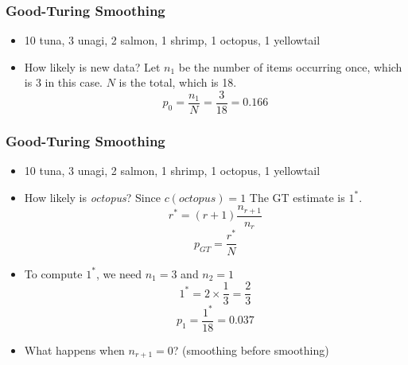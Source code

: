 \documentclass{beamer}
\begin{document}
\begin{frame}
\frametitle{Good-Turing Smoothing}
\begin{itemize}[<+->]
\item { \color{blue} 10} tuna,  { \color{blue} 3} unagi,  { \color{blue} 2} salmon,  { \color{blue} 1} shrimp,  { \color{blue} 1} octopus,  { \color{blue} 1} yellowtail
\item How likely is new data? Let $n_1$ be the number of items occurring once, which is {\color{blue} 3} in this case. $N$ is the total, which is {\color{blue} 18}.
\[ p_0 = \frac{n_1}{N} = \frac{3}{18} = 0.166 \]
\end{itemize}
\end{frame}

\begin{frame}
\frametitle{Good-Turing Smoothing}
\begin{itemize}[<+->]
\item { \color{blue} 10} tuna,  { \color{blue} 3} unagi,  { \color{blue} 2} salmon,  { \color{blue} 1} shrimp,  { \color{blue} 1} octopus,  { \color{blue} 1} yellowtail
\item How likely is {\em octopus}? Since $c(\textit{octopus}) = 1$ The GT estimate is $1^\ast$. 
{\color{blue} \[ r^\ast = (r+1) \frac{ n_{r+1} }{ n_r } \] }
{\color{blue} \[ p_{GT} = \frac{ r^\ast }{ N } \] }
\item To compute $1^\ast$, we need $n_1 = 3$ and $n_2 = 1$
\[ 1^\ast = 2 \times \frac{1}{3} = \frac{2}{3} \]
\[ p_1 = \frac{1^\ast}{18} = 0.037 \]
\item What happens when $n_{r+1} = 0$? (smoothing before smoothing)
\end{itemize}
\end{frame}
\end{document}
